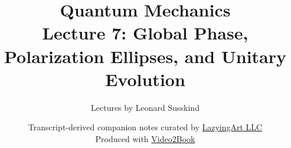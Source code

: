\documentclass[11pt,oneside]{book}
\begin{document}
\hypersetup{pageanchor=false}
\frontmatter
\title{Quantum Mechanics\\[0.45em]
\large Lecture 7: Global Phase, Polarization Ellipses, and Unitary Evolution}
\author{Lectures by Leonard Susskind}
\date{Transcript-derived companion notes curated by
\href{https://lazying.art}{LazyingArt LLC}\\[0.35em]
\small Produced with
\href{https://github.com/lachlanchen/Video2Book}{Video2Book}}
\maketitle
\hypersetup{pageanchor=true}
\mainmatter

\end{document}
